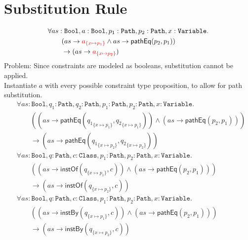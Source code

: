 \documentclass{article}          %
\begin{document}
\section{Substitution Rule}
\begin{align*}
&\forall as:\mathtt{Bool}, a:\mathtt{Bool}, p_1:\mathtt{Path}, p_2:\mathtt{Path}, x:\mathtt{Variable}.\\
&\hspace{2em} (as \rightarrow {\color{red} a_{\{x \mapsto p_1\}}} \land as \rightarrow \mathsf{pathEq}(p_2, p_1))\\
&\hspace{2em} \rightarrow (as \rightarrow {\color{red} a_{\{x \mapsto p_2\}}})
\end{align*}
Problem: Since constraints are modeled as booleans, substitution cannot be applied.\\
%
Instantiate $a$ with every possible constraint type proposition, to allow for path substitution.
\begin{align*}
&\forall as:\mathtt{Bool}, q_1:\mathtt{Path}, q_2:\mathtt{Path}, p_1:\mathtt{Path}, p_2:\mathtt{Path}, x:\mathtt{Variable}.\\
&\hspace{2em} ((as \rightarrow \mathsf{pathEq}({q_1}_{\{x \mapsto p_1\}},{q_2}_{\{x \mapsto p_1\}})) \land (as \rightarrow \mathsf{pathEq}(p_2, p_1)))\\
&\hspace{2em} \rightarrow (as \rightarrow \mathsf{pathEq}({q_1}_{\{x \mapsto p_2\}},{q_2}_{\{x \mapsto p_2\}}))\\
&\forall as:\mathtt{Bool}, q:\mathtt{Path}, c:\mathtt{Class}, p_1:\mathtt{Path}, p_2:\mathtt{Path}, x:\mathtt{Variable}.\\
&\hspace{2em} ((as \rightarrow \mathsf{instOf}({q}_{\{x \mapsto p_1\}},c)) \land (as \rightarrow \mathsf{pathEq}(p_2, p_1)))\\
&\hspace{2em} \rightarrow (as \rightarrow \mathsf{instOf}({q}_{\{x \mapsto p_2\}},c))\\
&\forall as:\mathtt{Bool}, q:\mathtt{Path}, c:\mathtt{Class}, p_1:\mathtt{Path}, p_2:\mathtt{Path}, x:\mathtt{Variable}.\\
&\hspace{2em} ((as \rightarrow \mathsf{instBy}({q}_{\{x \mapsto p_1\}},c)) \land (as \rightarrow \mathsf{pathEq}(p_2, p_1)))\\
&\hspace{2em} \rightarrow (as \rightarrow \mathsf{instBy}({q}_{\{x \mapsto p_2\}},c))\\
\end{align*}
\end{document}
